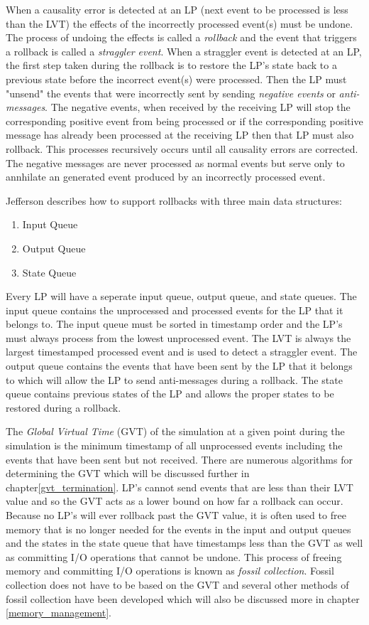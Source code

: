 \documentclass[11pt]{book}
\begin{document}
When a causality error is detected at an LP (next event to be processed is less than the
LVT) the effects of the incorrectly processed event(s) must be undone. The process
of undoing the effects is called a \emph{rollback} and the event that triggers a rollback
is called a \emph{straggler event}. When a straggler event is detected at an LP, the first
step taken during the rollback is to restore the LP's state back to a previous state before
the incorrect event(s) were processed. Then the LP must "unsend" the events that were
incorrectly sent by sending \emph{negative events} or \emph{anti-messages}. The negative
events, when received by the receiving LP will stop the corresponding positive event from
being processed or if the corresponding positive message has already been processed at
the receiving LP then that LP must also rollback. This processes recursively occurs until
all causality errors are corrected. The negative messages are never processed as normal
events but serve only to annhilate an generated event produced by an incorrectly processed
event.

Jefferson\cite{jefferson-85} describes how to support rollbacks with three main data structures:

\begin{enumerate}
    \item Input Queue
    \item Output Queue
    \item State Queue
\end{enumerate}

\noindent
Every LP will have a seperate input queue, output queue, and state queues. The input
queue contains the unprocessed and processed events for the LP that it belongs to. The
input queue must be sorted in timestamp order and the LP's must always process from the
lowest unprocessed event. The LVT is always the largest timestamped processed event and
is used to detect a straggler event. The output queue contains the events that have been
sent by the LP that it belongs to which will allow the LP to send anti-messages during a
rollback. The state queue contains previous states of the LP and allows the proper states
to be restored during a rollback.

The \emph{Global Virtual Time} (GVT) of the simulation at a given point during the simulation
is the minimum timestamp of all unprocessed events including the events that have been
sent but not received\cite{jefferson-85}. There are numerous algorithms for determining
the GVT which will be discussed further in chapter\ref{gvt_termination}. LP's cannot send
events that are less than their LVT value and so the GVT acts as a lower bound on how far
a rollback can occur. Because no LP's will ever rollback past the GVT value, it is often
used to free memory that is no longer needed for the events in the input and output queues
and the states in the state queue that have timestamps less than the GVT as well as committing
I/O operations that cannot be undone. This process of freeing memory and committing I/O
operations is known as \emph{fossil collection}. Fossil collection does not have to be based
on the GVT and several other methods of fossil collection have been developed which will
also be discussed more in chapter \ref{memory_management}.
\end{document}
